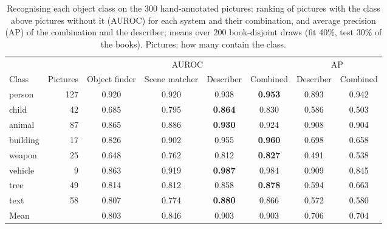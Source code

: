 \begin{table}[!htbp]
\centering
\caption[Recognising each object class]{Recognising each object class on the 300 hand-annotated pictures: ranking of pictures with the class above pictures without it (AUROC) for each system and their combination, and average precision (AP) of the combination and the describer; means over 200 book-disjoint draws (fit 40\%, test 30\% of the books). Pictures: how many contain the class.}
\label{tab:objects_per_class}
\small
\begin{adjustbox}{max width=\textwidth}
\begin{tabular}{lrcccccc}
\toprule
 & & \multicolumn{4}{c}{AUROC} & \multicolumn{2}{c}{AP} \\
\cmidrule(lr){3-6}\cmidrule(lr){7-8}
Class & Pictures & Object finder & Scene matcher & Describer & Combined & Describer & Combined \\
\midrule
person & 127 & 0.920 & 0.920 & 0.938 & \textbf{0.953} & 0.893 & 0.942 \\
child & 42 & 0.685 & 0.795 & \textbf{0.864} & 0.830 & 0.586 & 0.503 \\
animal & 87 & 0.865 & 0.886 & \textbf{0.930} & 0.924 & 0.908 & 0.904 \\
building & 17 & 0.826 & 0.902 & 0.955 & \textbf{0.960} & 0.698 & 0.658 \\
weapon & 25 & 0.648 & 0.762 & 0.812 & \textbf{0.827} & 0.491 & 0.538 \\
vehicle & 9 & 0.863 & 0.919 & \textbf{0.987} & 0.984 & 0.909 & 0.845 \\
tree & 49 & 0.814 & 0.812 & 0.858 & \textbf{0.878} & 0.594 & 0.663 \\
text & 58 & 0.807 & 0.774 & \textbf{0.880} & 0.866 & 0.572 & 0.580 \\
\midrule
Mean & & 0.803 & 0.846 & 0.903 & 0.903 & 0.706 & 0.704 \\
\bottomrule
\end{tabular}
\end{adjustbox}
\end{table}

